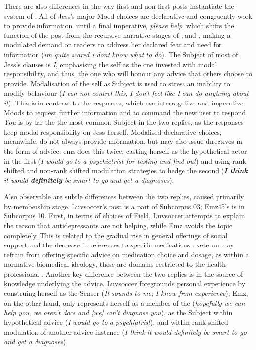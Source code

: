 There are also differences in the way first and non\hyp{}first \glspl{post} instantiate the system of . All of Jess's major Mood choices are declarative and congruently work to provide information, until a final imperative, \emph{please help}, which shifts the function of the \gls{post} from the recursive narrative stages of ,  and , making a modulated demand on readers to address her declared fear and need for information (\emph{im quite scared i dont know what to do}). The Subject of most of Jess's clauses is \emph{I}, emphasising the self as the one invested with modal responsibility, and thus, the one who will honour any advice that others choose to provide. Modalisation of the self as Subject is used to stress an inability to modify behaviour (\emph{I can not control this}, \emph{I don't feel like I can do anything about it}). This is in contrast to the responses, which use interrogative and imperative Moods to request further information and to command the new user to respond. \emph{You} is by far the the most common Subject in the two replies, as the responses keep modal responsibility on Jess herself. Modalised declarative choices, meanwhile, do not always provide information, but may also issue directives in the form of advice: emz does this twice, casting herself as the hypothetical actor in the first (\emph{I would go to a psychiatrist for testing and find out}) and using rank shifted and non\hyp{}rank shifted modulation strategies to hedge the second (\emph{\textbf{I think} it would \textbf{definitely} be smart to go and get a diagnoses}).

Also observable are subtle differences between the two replies, caused primarily by membership stage. Luvsoccer's post is a part of Subcorpus 03; Emz45's is in Subcorpus 10. First, in terms of choices of Field, Luvsoccer attempts to explain the reason that antidepressants are not helping, while Emz avoids the topic completely. This is related to the gradual rise in general offerings of social support and the decrease in references to specific medications \cite{wang_stay_2012}: veteran  may refrain from offering specific advice on medication choice and dosage, as within a normative biomedical ideology, these are domains restricted to the health professional \cite{vayreda_social_2009}. Another key difference between the two replies is in the source of knowledge underlying the advice. Luvsoccer foregrounds personal experience by construing herself as the Senser (\emph{It sounds to me}; \emph{I know from experience}); Emz, on the other hand, only represents herself as a \gls{member} of the  (\emph{hopefully we can help you}, \emph{we aren't docs and [we] can't diagnose you}), as the Subject within hypothetical advice (\emph{I would go to a psychiatrist}), and within rank shifted modulation of another advice instance (\emph{I think it would definitely be smart to go and get a diagnoses}). 

